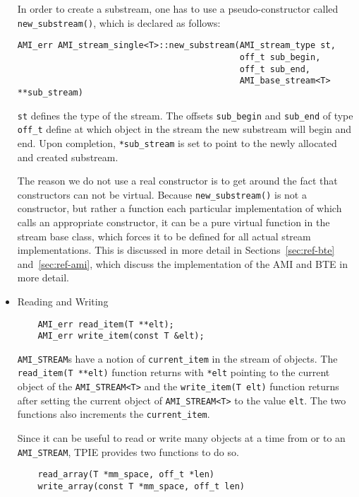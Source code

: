 \begin{itemize}
In order to create a substream, one has to use a pseudo-constructor called
\verb|new_substream()|, which is declared as follows:
\begin{verbatim}
AMI_err AMI_stream_single<T>::new_substream(AMI_stream_type st,
                                            off_t sub_begin,
                                            off_t sub_end,
                                            AMI_base_stream<T> **sub_stream)
\end{verbatim}
\verb|st| defines the type of the stream. The offsets \verb|sub_begin| and
\verb|sub_end| of type \verb|off_t| define at which object in the stream
the new substream will begin and end. Upon completion, \verb|*sub_stream| is
set to point to the newly allocated and created substream.

The reason we do not use a
real constructor is to get around the fact that constructors can not be
virtual. Because \verb|new_substream()| is not a constructor, but rather a
function each particular implementation of which calls an appropriate
constructor, it can be a pure virtual function in the stream base class,
which forces it to be defined for all actual stream implementations. This
is discussed in more detail in Sections~\ref{sec:ref-bte}
and~\ref{sec:ref-ami}, which discuss the implementation
of the AMI and BTE in more detail.

\item{Reading and Writing}

\begin{verbatim}
    AMI_err read_item(T **elt);
    AMI_err write_item(const T &elt);
\end{verbatim}

\verb|AMI_STREAM|s have a notion of \verb|current_item| in the stream of
objects. The \verb|read_item(T **elt)| function returns with \verb|*elt|
pointing to the current object of the \verb|AMI_STREAM<T>| and the
\verb|write_item(T elt)| function returns after setting the current object
of \verb|AMI_STREAM<T>| to the value \verb|elt|. The two functions also
increments the \verb|current_item|.

Since it can be useful to read or write many objects at a time from or to
an \verb|AMI_STREAM|, TPIE provides two functions to do so.

\begin{verbatim}
    read_array(T *mm_space, off_t *len)
    write_array(const T *mm_space, off_t len)
\end{verbatim}


\end{itemize}
